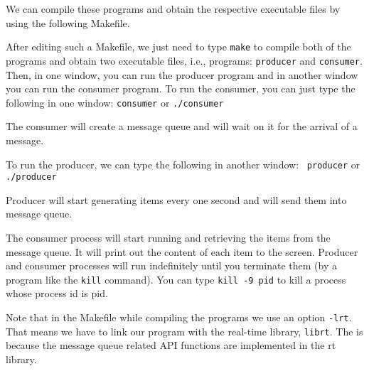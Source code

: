 We can compile these programs and obtain the respective executable
files by using the following Makefile.


After editing such a Makefile, we just need to type {\tt make} to
compile both of the programs and obtain two executable files, i.e.,
programs: {\tt producer} and {\tt consumer}. Then, in one window, you
can run the producer program and in another window you can run the
consumer program. To run the consumer, you can just type the following
in one window: {\tt consumer} or {\tt ./consumer}

The consumer will create a message queue and will wait on it for the
arrival of a message.

To run the producer, we can type the following in another window: {\tt
  producer} or {\tt ./producer}

Producer will start generating items every one second and will send
them into message queue. 

The consumer process will start running and retrieving the items from
the message queue. It will print out the content of each item to the
screen. Producer and consumer processes will run indefinitely until
you terminate them (by a program like the {\tt kill} command). You can
type {\tt kill -9 pid} to kill a process whose process id is pid.


Note that in the Makefile while compiling the programs we use an
option {\tt -lrt}. That means we have to link our program with the
real-time library, {\tt librt}. The is because the message queue
related API functions are implemented in the rt library.
